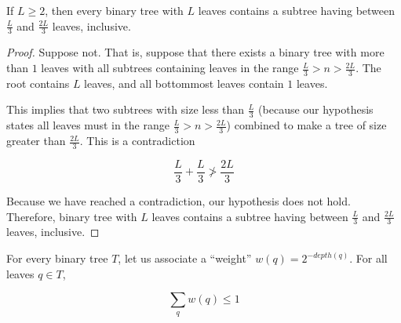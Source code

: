 \documentclass[12pt]{scrartcl}
\begin{document}
\maketitle

\problem{}
\begin{theorem}
    If $L \geq 2$, then every binary tree with $L$ leaves contains a subtree having between $\frac{L}{3}$ and $\frac{2L}{3}$ leaves, inclusive.
\end{theorem}

\begin{proof}
        Suppose not. That is, suppose that there exists a binary tree with more than $1$ leaves with all subtrees containing leaves in the range $\frac{L}{3} > n > \frac{2L}{3}$. The root contains $L$ leaves, and all bottommost leaves contain $1$ leaves.

        This implies that two subtrees with size less than $\frac{L}{3}$ (because our hypothesis states all leaves must in the range $\frac{L}{3} > n > \frac{2L}{3}$) combined to make a tree of size greater than $\frac{2L}{3}$. This is a contradiction

        \begin{equation*}
            \frac{L}{3} + \frac{L}{3} \not > \frac{2L}{3}
        \end{equation*}

        Because we have reached a contradiction, our hypothesis does not hold. Therefore, binary tree with $L$ leaves contains a subtree having between $\frac{L}{3}$ and $\frac{2L}{3}$ leaves, inclusive.
\end{proof}


\problem{}
\begin{theorem}
    For every binary tree $T$, let us associate a ``weight'' $w(q) = 2^{-depth(q)}$. For all leaves $q \in T$,

    \begin{equation*}
        \sum _q w(q) \leq 1
    \end{equation*}
\end{theorem}
\end{document}
